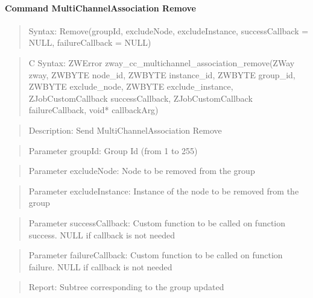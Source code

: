 \paragraph{Command MultiChannelAssociation Remove}
\begin{quote}Syntax: Remove(groupId, excludeNode, excludeInstance, successCallback = NULL, failureCallback = NULL)\end{quote}
\begin{quote}C Syntax: ZWError zway\_cc\_multichannel\_association\_remove(ZWay zway, ZWBYTE node\_id, ZWBYTE instance\_id, ZWBYTE group\_id, ZWBYTE exclude\_node, ZWBYTE exclude\_instance, ZJobCustomCallback successCallback, ZJobCustomCallback failureCallback, void* callbackArg)\end{quote}
\begin{quote}Description: Send MultiChannelAssociation Remove\end{quote}
\begin{quote}Parameter groupId: Group Id (from 1 to 255)\end{quote}
\begin{quote}Parameter excludeNode: Node to be removed from the group\end{quote}
\begin{quote}Parameter excludeInstance: Instance of the node to be removed from the group\end{quote}
\begin{quote}Parameter successCallback: Custom function to be called on function success. NULL if callback is not needed\end{quote}
\begin{quote}Parameter failureCallback: Custom function to be called on function failure. NULL if callback is not needed\end{quote}
\begin{quote}Report: Subtree corresponding to the group updated\end{quote}

